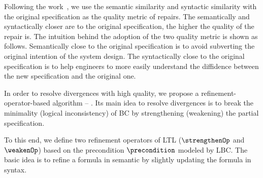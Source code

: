 Following the work~\cite{Brizzio21Automated}, we use the semantic similarity and syntactic similarity with the original specification as the quality metric of repairs.
The semantically and syntactically closer are to the original specification, the higher the quality of the repair is.
The intuition behind the adoption of the two quality metric is shown as follows.
Semantically close to the original specification is to avoid subverting the original intention of the system design.
The syntactically close to the original specification is to help engineers to more easily understand the diffidence between the new specification and the original one.

In order to resolve divergences with high quality, we propose a refinement-operator-based algorithm -- \resolver.
Its main idea to resolve divergences is to break the minimality (\resp logical inconsistency) of BC by strengthening (\resp weakening) the partial specification.

To this end, we define two refinement operators of LTL ($\strengthenOp$ and $\weakenOp$) based on the precondition $\precondition$ modeled by LBC.
The basic idea is to refine a formula in semantic by slightly updating the formula in syntax.

